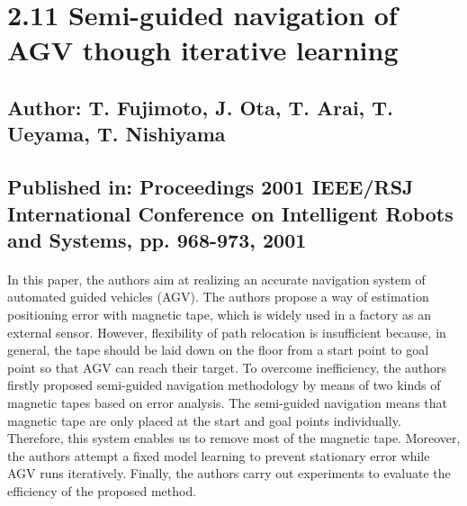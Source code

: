 \section*{2.11 Semi-guided navigation of AGV though iterative learning\cite{TFujimoto}}
\subsection*{Author: T. Fujimoto, J. Ota, T. Arai, T. Ueyama, T. Nishiyama}
\subsection*{Published in: Proceedings 2001 IEEE/RSJ International Conference on Intelligent Robots and Systems, pp. 968-973, 2001}
\paragraph{}In this paper, the authors aim at realizing an accurate navigation system of automated guided vehicles (AGV). The authors propose a way of estimation positioning error with magnetic tape, which is widely used in a factory as an external sensor. However, flexibility of path relocation is insufficient because, in general, the tape should be laid down on the floor from a start point to goal point so that AGV can reach their target. To overcome inefficiency, the authors firstly proposed semi-guided navigation methodology by means of two kinds of magnetic tapes based on error analysis. The semi-guided navigation means that magnetic tape are only placed at the start and goal points individually. Therefore, this system enables us to remove most of the magnetic tape. Moreover, the authors attempt a fixed model learning to prevent stationary error while AGV runs iteratively. Finally, the authors carry out experiments to evaluate the efficiency of the proposed method.


